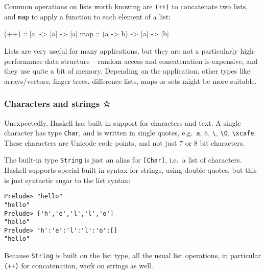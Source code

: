\documentclass[11pt,
  american,
  DIV13]{article}
\newenvironment{Shaded}{}{}
\newcommand{\FunctionTok}[1]{\textcolor[rgb]{0.02,0.16,0.49}{#1}}
\newcommand{\NormalTok}[1]{#1}
\newcommand{\OtherTok}[1]{\textcolor[rgb]{0.00,0.44,0.13}{#1}}
\begin{document}
Common operations on lists worth knowing are \texttt{(++)} to
concatenate two lists, and \texttt{map} to apply a function to each
element of a list:

\begin{Shaded}
\begin{Highlighting}[]
\OtherTok{(++) ::}\NormalTok{ [a] }\OtherTok{{-}\textgreater{}}\NormalTok{ [a] }\OtherTok{{-}\textgreater{}}\NormalTok{ [a]}
\FunctionTok{map}\OtherTok{ ::}\NormalTok{ (a }\OtherTok{{-}\textgreater{}}\NormalTok{ b) }\OtherTok{{-}\textgreater{}}\NormalTok{ [a] }\OtherTok{{-}\textgreater{}}\NormalTok{ [b]}
\end{Highlighting}
\end{Shaded}

Lists are very useful for many applications, but they are not a
particularly high-performance data structure -- random access and
concatenation is expensive, and they use quite a bit of memory.
Depending on the application, other types like arrays/vectors, finger
trees, difference lists, maps or sets might be more suitable.

\hypertarget{characters-and-strings}{%
\subsubsection{Characters and strings ☆}\label{characters-and-strings}}

Unexpectedly, Haskell has built-in support for characters and text. A
single character has type \texttt{Char}, and is written in single
quotes, e.g.~\texttt{\textquotesingle{}a\textquotesingle{}},
\texttt{\textquotesingle{}☃\textquotesingle{}},
\texttt{\textquotesingle{}\textbackslash{}\textquotesingle{}\textquotesingle{}},
\texttt{\textquotesingle{}\textbackslash{}0\textquotesingle{}},
\texttt{\textquotesingle{}\textbackslash{}xcafe\textquotesingle{}}.
These characters are Unicode code points, and not just 7 or 8 bit
characters.

The built-in type \texttt{String} is just an alias for
\texttt{{[}Char{]}}, i.e.~a list of characters. Haskell supports special
built-in syntax for strings, using double quotes, but this is just
syntactic sugar to the list syntax:

\begin{verbatim}
Prelude> "hello"
"hello"
Prelude> ['h','e','l','l','o']
"hello"
Prelude> 'h':'e':'l':'l':'o':[]
"hello"
\end{verbatim}

Because \texttt{String} is built on the list type, all the usual list
operations, in particular \texttt{(++)} for concatenation, work on
strings as well.
\end{document}
